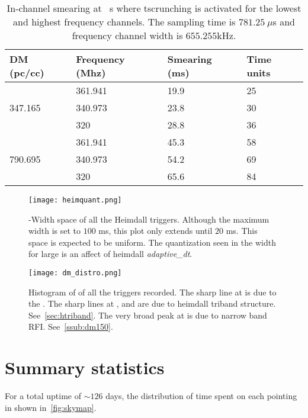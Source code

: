 \begin{table}
	\label{tab:dmsmearing}
	\caption{In-channel smearing at \dm~s where tscrunching is activated for the lowest and highest frequency channels. The sampling time is $781.25\ \mu$s and frequency channel width is $655.255$kHz.}
		\begin{tabular}{llll}
			\toprule
			DM (pc/cc)               & Frequency (Mhz) & Smearing (ms) & Time units \\
			\midrule
			\multirow{3}{*}{347.165} & 361.941         & 19.9          & 25         \\
															 & 340.973         & 23.8          & 30         \\
															 & 320             & 28.8          & 36         \\
			\multirow{3}{*}{790.695} & 361.941         & 45.3          & 58         \\
															 & 340.973         & 54.2          & 69         \\
															 & 320             & 65.6          & 84        
			\bottomrule
		\end{tabular}
\end{table}

\begin{figure}
	\label{fig:triheimdall}
	\texttt{[image: heimquant.png]}
	\caption{\dm-Width space of all the Heimdall triggers. Although the maximum width is set to $100$ ms, this plot only extends until $20$ ms.
		This space is expected to be uniform. The quantization seen in the width for large \dm is an affect of heimdall \emph{adaptive\_dt}.
	}
\end{figure}

\begin{figure}
	\label{fig:histdm}
	\texttt{[image: dm\_distro.png]}
	\caption{Histogram of \dm of all the triggers recorded.
		The sharp line at  is due to the .
		The sharp lines at ,  and  are due to heimdall triband structure. See~\autoref{sec:htriband}.
		The very broad peak at  is due to narrow band RFI. See~\autoref{ssub:dm150}.
	}
\end{figure}


\section{Summary statistics}
\label{sec:sum}
\par For a total uptime of $\sim 126$ days, the distribution of time spent on each pointing in shown in~\autoref{fig:skymap}.

